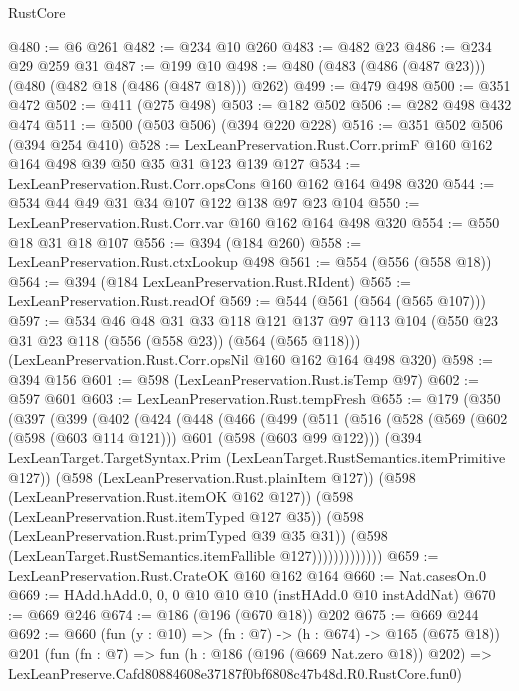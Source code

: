 \begin{lexlean}{RustCore}
\begin{coremodule}
@480 := @6 @261
@482 := @234 @10 @260
@483 := @482 @23
@486 := @234 @29 @259 @31
@487 := @199 @10
@498 := @480 (@483 (@486 (@487 @23))) (@480 (@482 @18 (@486 (@487 @18))) @262)
@499 := @479 @498
@500 := @351 @472
@502 := @411 (@275 @498)
@503 := @182 @502
@506 := @282 @498 @432 @474
@511 := @500 (@503 @506) (@394 @220 @228)
@516 := @351 @502 @506 (@394 @254 @410)
@528 := LexLeanPreservation.Rust.Corr.primF @160 @162 @164 @498 @39 @50 @35 @31 @123 @139 @127
@534 := LexLeanPreservation.Rust.Corr.opsCons @160 @162 @164 @498 @320
@544 := @534 @44 @49 @31 @34 @107 @122 @138 @97 @23 @104
@550 := LexLeanPreservation.Rust.Corr.var @160 @162 @164 @498 @320
@554 := @550 @18 @31 @18 @107
@556 := @394 (@184 @260)
@558 := LexLeanPreservation.Rust.ctxLookup @498
@561 := @554 (@556 (@558 @18))
@564 := @394 (@184 LexLeanPreservation.Rust.RIdent)
@565 := LexLeanPreservation.Rust.readOf
@569 := @544 (@561 (@564 (@565 @107)))
@597 := @534
    @46
    @48
    @31
    @33
    @118
    @121
    @137
    @97
    @113
    @104
    (@550 @23 @31 @23 @118 (@556 (@558 @23)) (@564 (@565 @118)))
    (LexLeanPreservation.Rust.Corr.opsNil @160 @162 @164 @498 @320)
@598 := @394 @156
@601 := @598 (LexLeanPreservation.Rust.isTemp @97)
@602 := @597 @601
@603 := LexLeanPreservation.Rust.tempFresh
@655 := @179
    (@350
      (@397
        (@399
          (@402
            (@424
              (@448
                (@466
                  (@499
                    (@511
                      (@516
                        (@528
                          (@569 (@602 (@598 (@603 @114 @121))) @601 (@598 (@603 @99 @122)))
                          (@394
                            LexLeanTarget.TargetSyntax.Prim
                            (LexLeanTarget.RustSemantics.itemPrimitive @127))
                          (@598 (LexLeanPreservation.Rust.plainItem @127))
                          (@598 (LexLeanPreservation.Rust.itemOK @162 @127))
                          (@598 (LexLeanPreservation.Rust.itemTyped @127 @35))
                          (@598 (LexLeanPreservation.Rust.primTyped @39 @35 @31))
                          (@598 (LexLeanTarget.RustSemantics.itemFallible @127)))))))))))))
@659 := LexLeanPreservation.Rust.CrateOK @160 @162 @164
@660 := Nat.casesOn.{0}
@669 := HAdd.hAdd.{0, 0, 0} @10 @10 @10 (instHAdd.{0} @10 instAddNat)
@670 := @669 @246
@674 := @186 (@196 (@670 @18)) @202
@675 := @669 @244
@692 := @660
    (fun (y : @10) => (fn : @7) -> (h : @674) -> @165 (@675 @18))
    @201
    (fun (fn : @7) =>
    fun (h : @186 (@196 (@669 Nat.zero @18)) @202) =>
    LexLeanPreserve.Cafd80884608e37187f0bf6808c47b48d.R0.RustCore.fun0)

\end{coremodule}
\end{lexlean}
